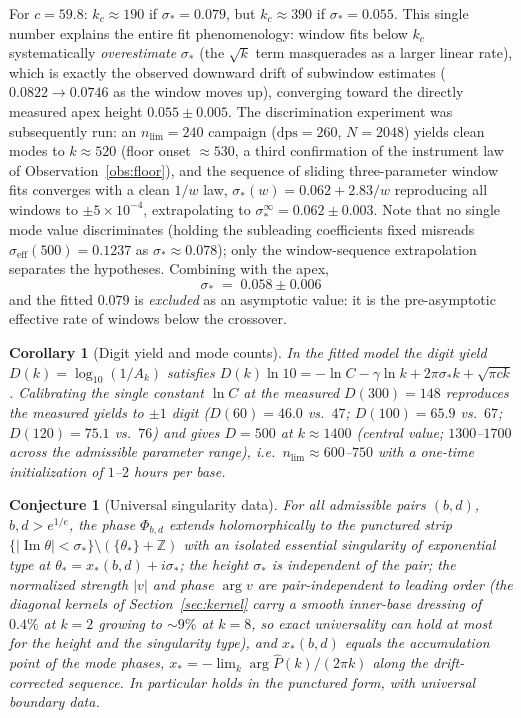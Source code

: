 \documentclass[11pt,a4paper]{article}
\newtheorem{corollary}[theorem]{Corollary}
\newtheorem{conjecture}[theorem]{Conjecture}
\theoremstyle{definition}
\theoremstyle{remark}
\newcommand{\Z}{\mathbb{Z}}
\newcommand{\eff}{\mathrm{eff}}
\begin{document}
For $c=59.8$: $k_c\approx190$ if $\sigma_*=0.079$, but $k_c\approx390$ if
$\sigma_*=0.055$. This single number explains the entire fit phenomenology: window fits below
$k_c$ systematically \emph{overestimate} $\sigma_*$ (the $\sqrt k$ term masquerades as a
larger linear rate), which is exactly the observed downward drift of subwindow estimates
($0.0822\to0.0746$ as the window moves up), converging toward the directly measured apex
height $0.055\pm0.005$. The discrimination experiment was subsequently run: an
$n_{\mathrm{lim}}=240$ campaign ($\mathrm{dps}=260$, $N=2048$) yields clean modes to
$k\approx520$ (floor onset $\approx530$, a third confirmation of the instrument law of
Observation~\ref{obs:floor}), and the sequence of sliding three-parameter window fits
converges with a clean $1/w$ law, $\sigma_*(w)=0.062+2.83/w$ reproducing all windows to
$\pm5\times10^{-4}$, extrapolating to $\sigma_*^{\infty}=0.062\pm0.003$. Note that no
single mode value discriminates (holding the subleading coefficients fixed misreads
$\sigma_\eff(500)=0.1237$ as $\sigma_*\approx0.078$); only the window-sequence
extrapolation separates the hypotheses. Combining with the apex,
\[
\boxed{\ \sigma_*\;=\;0.058\pm0.006\ }
\]
and the fitted $0.079$ is \emph{excluded} as an asymptotic value: it is the
pre-asymptotic effective rate of windows below the crossover.

\begin{corollary}[Digit yield and mode counts]\label{cor:yield}
In the fitted model the digit yield $D(k)=\log_{10}(1/A_k)$ satisfies
$D(k)\ln10=-\ln C-\gamma\ln k+2\pi\sigma_*k+\sqrt{\pi ck}$. Calibrating the single constant
$\ln C$ at the measured $D(300)=148$ reproduces the measured yields to $\pm1$ digit
($D(60)=46.0$ vs.\ $47$; $D(100)=65.9$ vs.\ $67$; $D(120)=75.1$ vs.\ $76$) and gives
$D=500$ at $k\approx1400$ (central value; $1300$--$1700$ across the admissible parameter
range), i.e.\ $n_{\mathrm{lim}}\approx600$--$750$ with a one-time initialization of
$1$--$2$ hours per base.
\end{corollary}

\begin{conjecture}[Universal singularity data]\label{conj:universal}
For all admissible pairs $(b,d)$, $b,d>e^{1/e}$, the phase $\Phi_{b,d}$ extends
holomorphically to the punctured strip
$\{\lvert\operatorname{Im}\theta\rvert<\sigma_*\}\setminus(\{\theta_*\}+\Z)$ with an isolated
essential singularity of exponential type at $\theta_*=x_*(b,d)+i\sigma_*$; the height
$\sigma_*$ is independent of the pair; the normalized strength $\lvert v\rvert$ and phase
$\arg v$ are pair-independent to leading order (the diagonal kernels of
Section~\ref{sec:kernel} carry a smooth inner-base dressing of $0.4\%$ at $k=2$ growing to
$\sim9\%$ at $k=8$, so exact universality can hold at most for the height and the
singularity type),
and $x_*(b,d)$ equals the accumulation point of the mode phases,
$x_*=-\lim_k \arg\widehat P(k)/(2\pi k)$ along the drift-corrected sequence. In particular
\cite[Conj.~8.1]{phaselaw} holds in the punctured form, with universal boundary data.
\end{conjecture}
\end{document}
